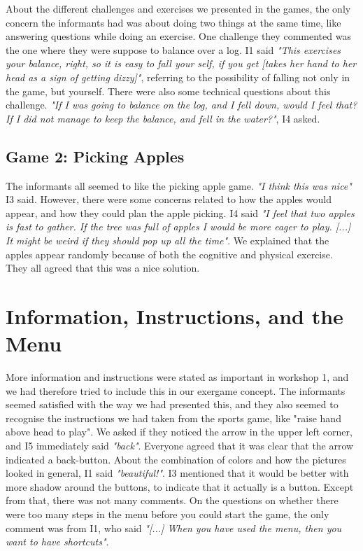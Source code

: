 About the different challenges and exercises we presented in the games, the only concern the informants had was about doing two things at the same time, like answering questions while doing an exercise. One challenge they commented was the one where they were suppose to balance over a log. I1 said \emph{"This exercises your balance, right, so it is easy to fall your self, if you get [takes her hand to her head as a sign of getting dizzy]"}, referring to the possibility of falling not only in the game, but yourself. There were also some technical questions about this challenge. \emph{"If I was going to balance on the log, and I fell down, would I feel that? If I did not manage to keep the balance, and fell in the water?"}, I4 asked. 

\subsection{Game 2: Picking Apples}

The informants all seemed to like the picking apple game. \emph{"I think this was nice"} I3 said. However, there were some concerns related to how the apples would appear, and how they could plan the apple picking. I4 said \emph{"I feel that two apples is fast to gather. If the tree was full of apples I would be more eager to play. [...] It might be weird if they should pop up all the time"}. We explained that the apples appear randomly because of both the cognitive and physical exercise. They all agreed that this was a nice solution. 

\section{Information, Instructions, and the Menu}

More information and instructions were stated as important in workshop 1, and we had therefore tried to include this in our exergame concept. The informants seemed satisfied with the way we had presented this, and they also seemed to recognise the instructions we had taken from the sports game, like "raise hand above head to play". We asked if they noticed the arrow in the upper left corner, and I5 immediately said \emph{"back"}. Everyone agreed that it was clear that the arrow indicated a back-button. About the combination of colors and how the pictures looked in general, I1 said \emph{"beautiful!"}. I3 mentioned that it would be better with more shadow around the buttons, to indicate that it actually is a button. Except from that, there was not many comments. On the questions on whether there were too many steps in the menu before you could start the game, the only comment was from I1, who said \emph{"[...] When you have used the menu, then you want to have shortcuts"}. 


